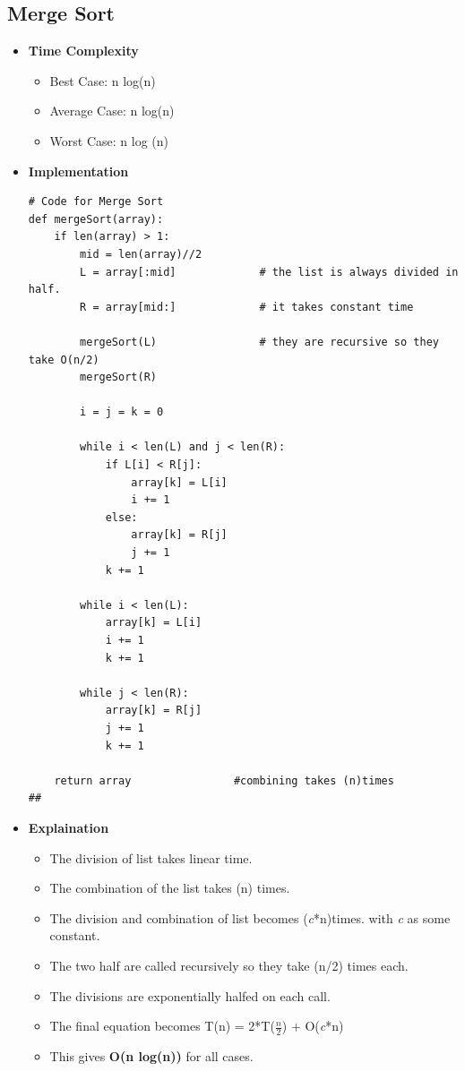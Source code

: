 \documentclass{article}
\begin{document}
\subsection{Merge Sort}
\begin{itemize}
    \item \textbf{Time Complexity}
        \begin{itemize}
            \item Best Case: n log(n)
            \item Average Case: n log(n)
            \item Worst Case: n log (n)
        \end{itemize}
    \item \textbf{Implementation}
\begin{verbatim}
# Code for Merge Sort
def mergeSort(array):
    if len(array) > 1:      
        mid = len(array)//2         
        L = array[:mid]             # the list is always divided in half.
        R = array[mid:]             # it takes constant time

        mergeSort(L)                # they are recursive so they take O(n/2)
        mergeSort(R)                
 
        i = j = k = 0

        while i < len(L) and j < len(R):
            if L[i] < R[j]:
                array[k] = L[i]
                i += 1
            else:
                array[k] = R[j]
                j += 1
            k += 1

        while i < len(L):
            array[k] = L[i]
            i += 1
            k += 1
 
        while j < len(R):
            array[k] = R[j]
            j += 1
            k += 1

    return array                #combining takes (n)times
##
\end{verbatim}
    \item \textbf{Explaination}
    \begin{itemize}
        \item The division of list takes linear time.
        \item The combination of the list takes (n) times.
        \item The division and combination of list becomes (\textit{c}*n)times. with \textit{c} as some constant.
        \item The two half are called recursively so they take (n/2) times each.
        \item The divisions are exponentially halfed on each call.
        \item The final equation becomes T(n) = 2*T(\( \frac{n}{2} \)) + O(\textit{c}*n)
        \item This gives \textbf{O(n log(n))} for all cases.
    \end{itemize}
\end{itemize}
\end{document}
